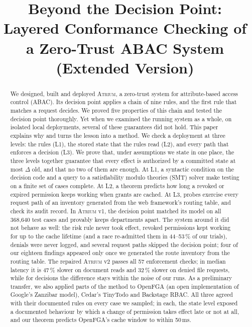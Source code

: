 \documentclass[sigconf,review,anonymous]{acmart}
\newif\ifanon
\newcommand{\sysname}{\textsc{Atrium}\xspace}
\newcommand{\sysname}{\textsc{OpenZTAC}\xspace}
\begin{document}
\title[Beyond the Decision Point]{Beyond the Decision Point:\\
Layered Conformance Checking of a Zero-Trust ABAC System\\ (Extended Version)}

\ifanon
\author{Anonymous Author(s)}
\affiliation{\institution{Anonymous Institution}\country{}}
\else
\author{}
\fi

\begin{abstract}
We designed, built and deployed \sysname, a zero-trust system for attribute-based access control (ABAC). Its
decision point applies a chain of nine rules, and the first rule that matches a request decides. We proved
five properties of this chain and tested the decision point thoroughly. Yet when we examined the running
system as a whole, on isolated local deployments, several of these guarantees did not hold. This paper explains why and turns the lesson
into a method. We check a deployment at three levels: the rules (L1), the stored state that the rules read
(L2), and every path that enforces a decision (L3). We prove that, under assumptions we state in one place,
the three levels together guarantee that every effect is authorized by a committed state at most $\Delta$ old,
and that no two of them are enough. At L1, a syntactic condition on the decision code
and a query to a satisfiability modulo theories (SMT) solver make testing on a finite set of cases complete.
At L2, a theorem predicts how long a revoked or expired permission keeps working when grants are cached. At
L3, probes exercise every request path of an inventory generated from the web framework's routing table, and
check its audit record. In \sysname v1, the decision point matched
its model on all 368{,}640 test cases and provably keeps departments apart. The system around it did not
behave as well: the risk rule never took effect, revoked permissions kept working for up to the cache lifetime
(and a race re-admitted them in 44--53\,\% of our trials), denials were never logged,
and several request paths skipped the decision point; four of our eighteen findings appeared only once we
generated the route inventory from the routing table. The repaired \sysname v2 passes all 57 enforcement checks;
in median latency it is 47\,\% slower on document reads and 32\,\% slower on denied file requests, while for
decisions the difference stays within the noise of our runs.
As a preliminary transfer, we also applied parts of the method to OpenFGA (an open implementation of Google's
Zanzibar model), Cedar's TinyTodo and Backstage RBAC. All three agreed with their documented rules on every case
we sampled; in each, the state level exposed a documented behaviour by which a change of permission takes
effect late or not at all, and our theorem predicts OpenFGA's cache window to within 50\,ms.
\end{abstract}
\end{document}

